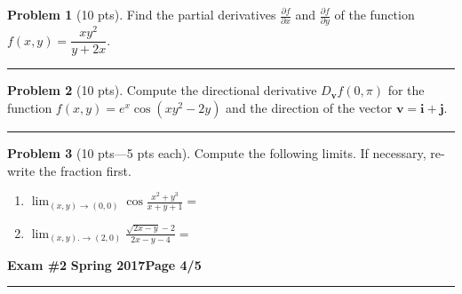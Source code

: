 \documentclass[12pt]{article}
\theoremstyle{definition}
\newtheorem{problem}{Problem}
\begin{document}
\bigskip
\begin{problem}[10 pts] Find the partial derivatives $\frac{\partial f}{\partial x}$ and $\frac{\partial f}{\partial y}$ of the function $f(x,y) = \dfrac{xy^2}{y+2x}$.
\vspace{3.5cm}
\begin{flushright}
\end{flushright}
\end{problem}
\hrule
\begin{problem}[10 pts]
Compute the directional derivative $D_{\boldsymbol{v}}f(0,\pi)$ for the function $f(x,y) = e^x \cos(xy^2-2y)$ and the direction of the vector $\boldsymbol{v} = \boldsymbol{i} + \boldsymbol{j}$.
\vspace{4.5cm}
\begin{flushright}
\end{flushright}
\end{problem}
\hrule
\begin{problem}[10 pts---5 pts each]
Compute the following limits.  If necessary, re-write the fraction first.
\begin{enumerate}
  \item $\displaystyle{\lim_{(x,y) \to (0,0)} \cos \frac{x^2+y^3}{x+y+1}} = $
  \vspace{1cm}
  \item $\displaystyle{\lim_{(x,y). \to (2,0)} \frac{\sqrt{2x-y}-2}{2x-y-4}} = $ 
\end{enumerate}
\end{problem}
\newpage

\hfill{\large\bf Exam \#2}\hfill{\large\bf
  Spring 2017}\hfill{\large\bf Page 4/5}\hrule

\bigskip
\end{document}
